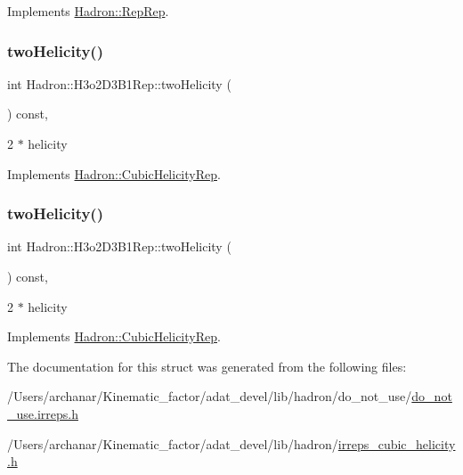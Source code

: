 Implements \mbox{\hyperlink{structHadron_1_1RepRep_ab3213025f6de249f7095892109575fde}{Hadron\+::\+Rep\+Rep}}.

\mbox{\label{structHadron_1_1H3o2D3B1Rep_a1052c3969643f837adfe2d8df8e0b1ce}} 
\subsubsection{\texorpdfstring{twoHelicity()}{twoHelicity()}\hspace{0.1cm}{\footnotesize\ttfamily [1/2]}}
{\footnotesize\ttfamily int Hadron\+::\+H3o2\+D3\+B1\+Rep\+::two\+Helicity (\begin{DoxyParamCaption}{ }\end{DoxyParamCaption}) const\hspace{0.3cm}{\ttfamily [inline]}, {\ttfamily [virtual]}}

2 $\ast$ helicity 

Implements \mbox{\hyperlink{structHadron_1_1CubicHelicityRep_af507aa56fc2747eacc8cb6c96db31ecc}{Hadron\+::\+Cubic\+Helicity\+Rep}}.

\mbox{\label{structHadron_1_1H3o2D3B1Rep_a1052c3969643f837adfe2d8df8e0b1ce}} 
\subsubsection{\texorpdfstring{twoHelicity()}{twoHelicity()}\hspace{0.1cm}{\footnotesize\ttfamily [2/2]}}
{\footnotesize\ttfamily int Hadron\+::\+H3o2\+D3\+B1\+Rep\+::two\+Helicity (\begin{DoxyParamCaption}{ }\end{DoxyParamCaption}) const\hspace{0.3cm}{\ttfamily [inline]}, {\ttfamily [virtual]}}

2 $\ast$ helicity 

Implements \mbox{\hyperlink{structHadron_1_1CubicHelicityRep_af507aa56fc2747eacc8cb6c96db31ecc}{Hadron\+::\+Cubic\+Helicity\+Rep}}.



The documentation for this struct was generated from the following files\+:\begin{DoxyCompactItemize}
\item 
/\+Users/archanar/\+Kinematic\+\_\+factor/adat\+\_\+devel/lib/hadron/do\+\_\+not\+\_\+use/\mbox{\hyperlink{do__not__use_8irreps_8h}{do\+\_\+not\+\_\+use.\+irreps.\+h}}\item 
/\+Users/archanar/\+Kinematic\+\_\+factor/adat\+\_\+devel/lib/hadron/\mbox{\hyperlink{lib_2hadron_2irreps__cubic__helicity_8h}{irreps\+\_\+cubic\+\_\+helicity.\+h}}\end{DoxyCompactItemize}
